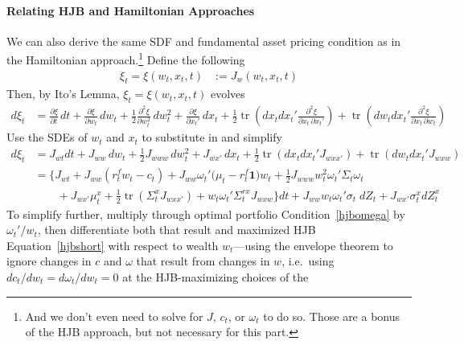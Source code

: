 \documentclass[12pt]{article}
\theoremstyle{plain}
\theoremstyle{definition}
\theoremstyle{remark}
\newcommand{\trace}{\operatorname{tr}}
\begin{document}
\paragraph{Relating HJB and Hamiltonian Approaches}
We can also derive the same SDF and fundamental asset pricing condition
as in the Hamiltonian approach.\footnote{%
  And we don't even need to solve for $J$, $c_t$, or $\omega_t$ to do
  so. Those are a bonus of the HJB approach, but not necessary for this
  part.
}
Define the following
\begin{align*}
  \xi_t
  =
  \xi(w_t,x_t,t)
  &:=
  J_w(w_t,x_t,t)
\end{align*}
Then, by Ito's Lemma, $\xi_t=\xi(w_t,x_t,t)$ evolves
\begin{align*}
  d\xi_t
  &=
  \frac{\partial\xi}{\partial t}\,dt
  + \frac{\partial\xi}{\partial w_t}\,dw_t
  +
    \frac{1}{2}
    \frac{\partial^2\xi}{\partial w_t^2}\,dw_t^2
  + \frac{\partial\xi}{\partial x_t'}\,dx_t
  +
    \frac{1}{2}
    \trace\left(
    dx_t
    dx_t'
    \frac{\partial^2\xi}{\partial x_t\,\partial x_t'}
    \right)
  +
  \trace
  \left(
  dw_t
  dx_t'
  \frac{\partial^2\xi}{\partial x_t\,\partial w_t}
  \right)
\end{align*}
Use the SDEs of $w_t$ and $x_t$ to substitute in and simplify
\begin{align*}
  d\xi_t
  &=
  J_{wt}
  dt
  +
  J_{ww}
  \,dw_t
  +
    \frac{1}{2}
    J_{www}
    \,dw_t^2
  + J_{wx'}
    \,dx_t
  +
    \frac{1}{2}
    \trace\left(
    dx_t
    dx_t'
    J_{wxx'}
    \right)
  +
  \trace
  \left(
  dw_t
  dx_t'
  J_{wxw}
  \right)
  \\
  &=
  \bigg\{
    J_{wt}
    +
    J_{ww}
    \left(r^f_tw_t-c_t\right)
    +
    J_{ww}
    \omega_{t}'
    \big(\mu_t - r^f_t\mathbf{1}\big)w_t
    +
    \frac{1}{2}
    J_{www}
    w_t^2
    \omega_{t}'
    \Sigma_t
    \omega_{t}
  \\
  &\qquad
    + J_{wx'}\mu_t^x
    +
    \frac{1}{2}
    \trace\left(
    \Sigma_t^x
    J_{wxx'}
    \right)
    +
    w_t\omega_t'\Sigma_t^{rx}
    J_{wxw}
  \bigg\}
  dt
  +
  J_{ww}
  w_t
  \omega_{t}'
  \sigma_t
  \;dZ_t
  + J_{wx'}
  \sigma^x_t
  dZ_t^x
\end{align*}
To simplify further, multiply through optimal portfolio
Condition~\ref{hjbomega} by $\omega_t'/w_t$, then differentiate both
that result and maximized HJB Equation~\ref{hjbshort} with respect to
wealth $w_t$---using the envelope theorem to ignore changes in $c$ and
$\omega$ that result from changes in $w$, i.e.\ using
$dc_t/dw_t=d\omega_t/dw_t=0$ at the HJB-maximizing choices of the
\end{document}
